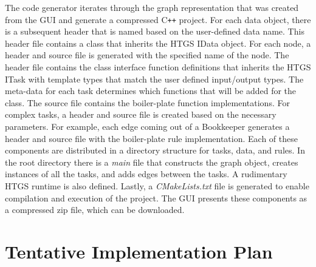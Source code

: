 \documentclass[]{article}
\begin{document}
The code generator iterates through the graph representation that was created from the GUI and generate a compressed C\texttt{++} project. For each data object, there is a subsequent header that is named based on the user-defined data name. This header file contains a class that inherits the HTGS IData object. For each node, a header and source file is generated with the specified name of the node. The header file contains the class interface function definitions that inherits the HTGS ITask with template types that match the user defined input/output types. The meta-data for each task determines which functions that will be added for the class. The source file contains the boiler-plate function implementations. For complex tasks, a header and source file is created based on the necessary parameters. For example, each edge coming out of a Bookkeeper generates a header and source file with the boiler-plate rule implementation. Each of these components are distributed in a directory structure for tasks, data, and rules. In the root directory there is a \emph{main} file that constructs the graph object, creates instances of all the tasks, and adds edges between the tasks. A rudimentary HTGS runtime is also defined. Lastly, a \emph{CMakeLists.txt} file is generated to enable compilation and execution of the project. The GUI presents these components as a compressed zip file, which can be downloaded.


\section{Tentative Implementation Plan}
\end{document}
